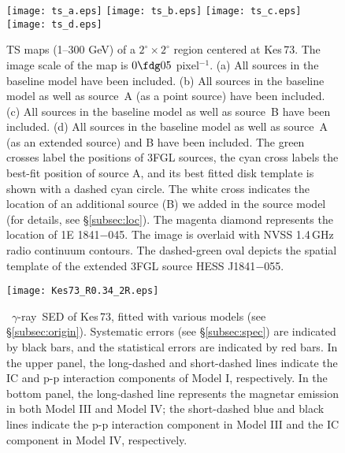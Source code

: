 \documentclass[12pt,preprint]{aastex}
\newcommand{\gray}{{\rm $\gamma$-ray}}
\begin{document}

\begin{figure}
\centering
\texttt{[image: ts\_a.eps]}
\texttt{[image: ts\_b.eps]}
\texttt{[image: ts\_c.eps]}
\texttt{[image: ts\_d.eps]}
\caption{TS maps (1--300 GeV) of a $2^{\circ}\times2^{\circ}$ region 
centered at Kes\,73. The image scale of the map is $0\fdg05$ pixel$^{-1}$.
(a) All sources  in the baseline model have been included. 
(b) All sources  in the baseline model 
as well as source~A (as a point source) have been included. 
(c)  All sources  in the baseline model 
as well as source~B have been  included. 
(d)  All sources  in the baseline model as well as source~A 
(as an extended source) and B have been  included.
The green  crosses label the positions of 3FGL sources, 
the cyan cross labels the best-fit position of source A, 
 and its best fitted disk template is shown with a dashed cyan circle.
The white cross  indicates the location of  an additional source (B) 
we added in the source model (for details, see  \S\ref{subsec:loc}).
The  magenta diamond represents the location of 1E 1841$-$045.
The image is overlaid with  NVSS 1.4\,GHz radio  continuum contours.
The  dashed-green oval depicts the spatial template of 
the extended 3FGL  source HESS J1841$-$055.}
\label{fig:tsmap}
\end{figure}



\begin{figure}
\centering
\texttt{[image: Kes73\_R0.34\_2R.eps]}
\caption{\Fermi\ \gray\ SED of Kes\,73, %
fitted with various models (see \S\ref{subsec:origin}).
Systematic errors (see \S\ref{subsec:spec})
are indicated by black bars, and the statistical errors are indicated by red bars.
In the upper panel, the long-dashed and short-dashed lines indicate 
the IC  and p-p interaction components  of Model I, respectively.
In the bottom panel, the long-dashed line represents the magnetar emission
in both Model III and Model IV;
the short-dashed  blue and black lines indicate the p-p interaction  component
in Model III and the IC  component in Model IV, respectively.}
\label{fig:sed}
\end{figure}
\newpage
\end{document}
